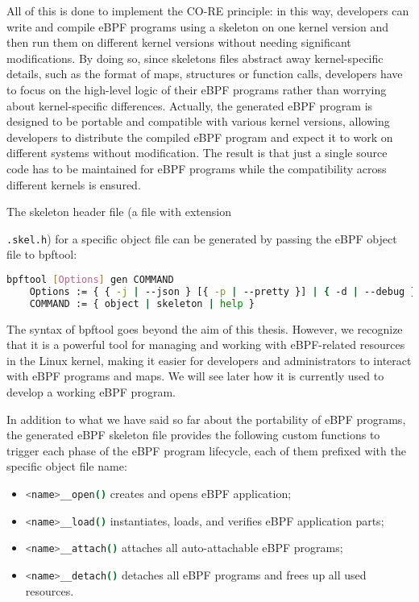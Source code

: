 All of this is done to implement the CO-RE principle: in this way, developers can write and compile eBPF programs using a skeleton on one kernel version and then run them on different kernel versions without needing significant modifications.
By doing so, since skeletons files abstract away kernel-specific details, such as the format of maps, structures or function calls, developers have to focus on the high-level logic of their eBPF programs rather than worrying about kernel-specific differences.
Actually, the generated eBPF program is designed to be portable and compatible with various kernel versions, allowing developers to distribute the compiled eBPF program and expect it to work on different systems without modification.
The result is that just a single source code has to be maintained for eBPF programs while the compatibility across different kernels is ensured.

The skeleton header file (a file with extension \raggedright\colorbox{backcolour}{\lstinline[style=commandline, language=bash]|.skel.h|}) for a specific object file can be generated by passing the eBPF object file to bpftool:

\begin{lstlisting}[style=commandline, language=bash, caption={bpftool command syntax.}]
	bpftool [Options] gen COMMAND
	Options := { { -j | --json } [{ -p | --pretty }] | { -d | --debug } | { -L | --use-loader } }
	COMMAND := { object | skeleton | help }
\end{lstlisting}

The syntax of bpftool goes beyond the aim of this thesis.
However, we recognize that it is a powerful tool for managing and working with eBPF-related resources in the Linux kernel, making it easier for developers and administrators to interact with eBPF programs and maps.
We will see later how it is currently used to develop a working eBPF program.

In addition to what we have said so far about the portability of eBPF programs, the generated eBPF skeleton file provides the following custom functions to trigger each phase of the eBPF program lifecycle, each of them prefixed with the specific object file name:

\begin{itemize}
	\item 
		\raggedright\colorbox{backcolour}{\lstinline[style=commandline, language=bash]|<name>__open()|} creates and opens eBPF application;
	\item 
		\raggedright\colorbox{backcolour}{\lstinline[style=commandline, language=bash]|<name>__load()|} instantiates, loads, and verifies eBPF application parts;
	\item 
		\raggedright\colorbox{backcolour}{\lstinline[style=commandline, language=bash]|<name>__attach()|} attaches all auto-attachable eBPF programs;
	\item 	
		\raggedright\colorbox{backcolour}{\lstinline[style=commandline, language=bash]|<name>__detach()|} detaches all eBPF programs and frees up all used resources.
\end{itemize}

